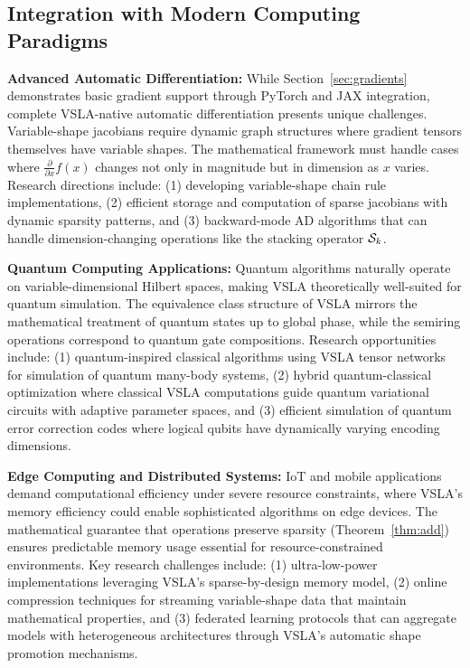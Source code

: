 \subsection{Integration with Modern Computing Paradigms}

\textbf{Advanced Automatic Differentiation:} While Section~\ref{sec:gradients} demonstrates basic gradient support through PyTorch and JAX integration, complete VSLA-native automatic differentiation presents unique challenges. Variable-shape jacobians require dynamic graph structures where gradient tensors themselves have variable shapes. The mathematical framework must handle cases where $\frac{\partial}{\partial x} f(x)$ changes not only in magnitude but in dimension as $x$ varies. Research directions include: (1) developing variable-shape chain rule implementations, (2) efficient storage and computation of sparse jacobians with dynamic sparsity patterns, and (3) backward-mode AD algorithms that can handle dimension-changing operations like the stacking operator $\mathcal{S}_k$.

\textbf{Quantum Computing Applications:} Quantum algorithms naturally operate on variable-dimensional Hilbert spaces, making VSLA theoretically well-suited for quantum simulation. The equivalence class structure of VSLA mirrors the mathematical treatment of quantum states up to global phase, while the semiring operations correspond to quantum gate compositions. Research opportunities include: (1) quantum-inspired classical algorithms using VSLA tensor networks for simulation of quantum many-body systems, (2) hybrid quantum-classical optimization where classical VSLA computations guide quantum variational circuits with adaptive parameter spaces, and (3) efficient simulation of quantum error correction codes where logical qubits have dynamically varying encoding dimensions.

\textbf{Edge Computing and Distributed Systems:} IoT and mobile applications demand computational efficiency under severe resource constraints, where VSLA's memory efficiency could enable sophisticated algorithms on edge devices. The mathematical guarantee that operations preserve sparsity (Theorem~\ref{thm:add}) ensures predictable memory usage essential for resource-constrained environments. Key research challenges include: (1) ultra-low-power implementations leveraging VSLA's sparse-by-design memory model, (2) online compression techniques for streaming variable-shape data that maintain mathematical properties, and (3) federated learning protocols that can aggregate models with heterogeneous architectures through VSLA's automatic shape promotion mechanisms.


